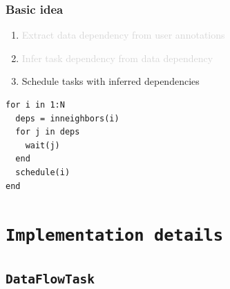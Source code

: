 \documentclass{beamer}
\begin{document}
\begin{frame}[fragile]

    \frametitle{Basic idea}
    \begin{enumerate}
        \item \textcolor{lightgray}{Extract data dependency from user annotations}
        \item \textcolor{lightgray}{Infer task dependency from data dependency}
        \item Schedule tasks with inferred dependencies
    \end{enumerate}
    
    \center
    
\begin{exampleblock}{}
\centering    
\begin{verbatim}
for i in 1:N
  deps = inneighbors(i)
  for j in deps
    wait(j)
  end
  schedule(i)
end
\end{verbatim}    
\end{exampleblock}
    
    
\end{frame}

\section{\texttt{Implementation details}}

\subsection{\texttt{DataFlowTask}}
\end{document}
